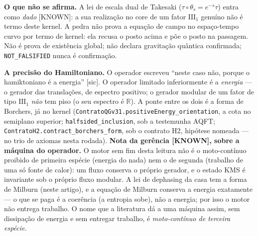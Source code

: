 \documentclass[11pt]{article}
\theoremstyle{definition}\newtheorem{deriv}{Derivação}
\begin{document}
\textbf{O que não se afirma.} A lei de escala dual de Takesaki ($\tau\circ\theta_s=e^{-s}\tau$) entra como \emph{dado} \textsf{[KNOWN]}: a sua realização no core de um fator $\mathrm{III}_1$ genuíno não é termo deste kernel. A pedra não prova a equação de campo no espaço-tempo curvo por termo de kernel: ela recusa o posto acima e põe o posto na passagem. Não é prova de existência global; não declara gravitação quântica confirmada; \texttt{NOT\_FALSIFIED} nunca é confirmação.

\textbf{A precisão do Hamiltoniano.} O operador escreveu ``neste caso não, porque o hamiktoniano é a energia'' [sic]. O operador limitado inferiormente é a \emph{energia} --- o gerador das translações, de espectro positivo; o gerador modular de um fator de tipo $\mathrm{III}_1$ \emph{não} tem piso (o seu espectro é $\mathbb{R}$). A ponte entre os dois é a forma de Borchers, já no kernel (\texttt{ContratoQGv31.positiveEnergy\_orientation}, a cota no semiplano superior; \texttt{halfsided\_inclusion}, sob a testemunha AQFT; \texttt{ContratoH2.contract\_borchers\_form}, sob o contrato H2, hipótese nomeada --- no trio de axiomas nesta rodada). \textbf{Nota da gerência \textsf{[KNOWN]}, sobre a máquina do operador.} O motor sem fim desta leitura não é o moto-contínuo proibido de primeira espécie (energia do nada) nem o de segunda (trabalho de uma só fonte de calor): um fluxo conserva o próprio gerador, e o estado KMS é invariante sob o próprio fluxo modular. A lei de dephasing da casa tem a forma de Milburn (neste artigo), e a equação de Milburn conserva a energia exatamente --- o que se paga é a coerência (a entropia sobe), não a energia; por isso o motor não entrega trabalho. O nome que a literatura dá a uma máquina assim, sem dissipação de energia e sem entregar trabalho, é \emph{moto-contínuo de terceira espécie}.
\end{document}
